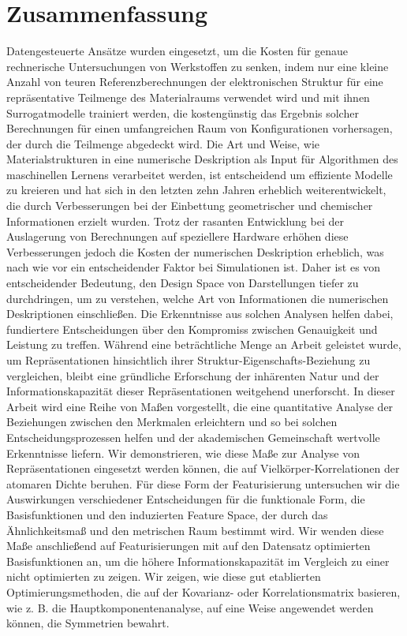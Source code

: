 \chapter*{Zusammenfassung}
Datengesteuerte Ansätze wurden eingesetzt, um die Kosten für genaue rechnerische Untersuchungen von Werkstoffen zu senken, indem nur eine kleine Anzahl von teuren Referenzberechnungen der elektronischen Struktur für eine repräsentative Teilmenge des Materialraums verwendet wird und mit ihnen Surrogatmodelle trainiert werden, die kostengünstig das Ergebnis solcher Berechnungen für einen umfangreichen Raum von Konfigurationen vorhersagen, der durch die Teilmenge abgedeckt wird.  Die Art und Weise, wie Materialstrukturen in eine numerische Deskription als Input für Algorithmen des maschinellen Lernens verarbeitet werden, ist entscheidend um effiziente Modelle zu kreieren und hat sich in den letzten zehn Jahren erheblich weiterentwickelt, die durch Verbesserungen bei der Einbettung geometrischer und chemischer Informationen erzielt wurden.  Trotz der rasanten Entwicklung bei der Auslagerung von Berechnungen auf speziellere Hardware erhöhen diese Verbesserungen jedoch die Kosten der numerischen Deskription erheblich, was nach wie vor ein entscheidender Faktor bei Simulationen ist.  Daher ist es von entscheidender Bedeutung, den Design Space von Darstellungen tiefer zu durchdringen, um zu verstehen, welche Art von Informationen die numerischen Deskriptionen einschließen.  Die Erkenntnisse aus solchen Analysen helfen dabei, fundiertere Entscheidungen über den Kompromiss zwischen Genauigkeit und Leistung zu treffen.  Während eine beträchtliche Menge an Arbeit geleistet wurde, um Repräsentationen hinsichtlich ihrer Struktur-Eigenschafts-Beziehung zu vergleichen, bleibt eine gründliche Erforschung der inhärenten Natur und der Informationskapazität dieser Repräsentationen weitgehend unerforscht. 
In dieser Arbeit wird eine Reihe von Maßen vorgestellt, die eine quantitative Analyse der Beziehungen zwischen den Merkmalen erleichtern und so bei solchen Entscheidungsprozessen helfen und der akademischen Gemeinschaft wertvolle Erkenntnisse liefern.  Wir demonstrieren, wie diese Maße zur Analyse von Repräsentationen eingesetzt werden können, die auf Vielkörper-Korrelationen der atomaren Dichte beruhen.  Für diese Form der Featurisierung untersuchen wir die Auswirkungen verschiedener Entscheidungen für die funktionale Form, die Basisfunktionen und den induzierten Feature Space, der durch das Ähnlichkeitsmaß und den metrischen Raum bestimmt wird.  Wir wenden diese Maße anschließend auf Featurisierungen mit auf den Datensatz optimierten Basisfunktionen an, um die höhere Informationskapazität im Vergleich zu einer nicht optimierten zu zeigen.  Wir zeigen, wie diese gut etablierten Optimierungsmethoden, die auf der Kovarianz- oder Korrelationsmatrix basieren, wie z. B. die Hauptkomponentenanalyse, auf eine Weise angewendet werden können, die Symmetrien bewahrt.
